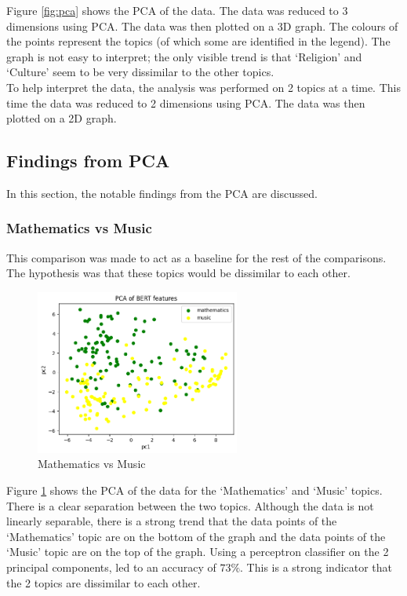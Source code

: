 Figure \ref{fig:pca} shows the PCA of the data. The data was reduced to 3 dimensions using PCA. The data was then plotted on a 3D
graph. The colours of the points represent the topics (of which some are identified in the legend). The graph is not easy to interpret;
the only visible trend is that `Religion' and `Culture' seem to be very dissimilar to the other topics.\\
To help interpret the data, the analysis was performed on 2 topics at a time. This time the data was reduced to 2 dimensions using
PCA. The data was then plotted on a 2D graph.
\subsection{Findings from PCA}
In this section, the notable findings from the PCA are discussed.
\subsubsection{Mathematics vs Music}
This comparison was made to act as a baseline for the rest of the comparisons. The hypothesis was that these topics would be
dissimilar to each other.
\begin{figure}
    \centering
    \includegraphics[width=0.6\textwidth]{../images/math-vs-music.png}
    \caption{Mathematics vs Music}
    \label{fig:math-vs-music}
\end{figure}

Figure \ref{fig:math-vs-music} shows the PCA of the data for the `Mathematics' and `Music' topics. There is a clear separation between
the two topics. Although the data is not linearly separable, there is a strong trend that the data points of the `Mathematics' topic
are on the bottom of the graph and the data points of the `Music' topic are on the top of the graph. Using a perceptron classifier
on the 2 principal components, led to an accuracy of $73\%$. This is a strong indicator that the 2 topics are dissimilar to each other.
